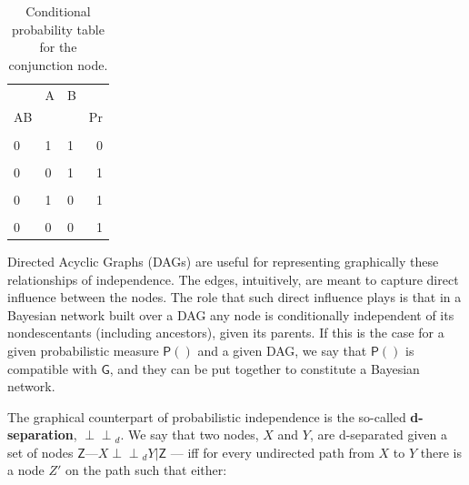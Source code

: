 \documentclass[
  10pt,
  dvipsnames,enabledeprecatedfontcommands]{scrartcl}
\newcommand{\indep}{\!\perp \!\!\! \perp\!}
\newcommand{\pr}[1]{\ensuremath{\mathsf{P}(#1)}}
\begin{document}
\begin{table}[h]
\begin{table}[H]
\centering
\begin{tabular}{lllr}
\toprule
\multicolumn{1}{c}{} & \multicolumn{1}{c}{A} & \multicolumn{1}{c}{B} & \multicolumn{1}{c}{} \\
AB &  &  & Pr\\
\midrule
\cellcolor{gray!6}{1} & \cellcolor{gray!6}{1} & \cellcolor{gray!6}{1} & \cellcolor{gray!6}{1}\\
0 & 1 & 1 & 0\\
\cellcolor{gray!6}{1} & \cellcolor{gray!6}{0} & \cellcolor{gray!6}{1} & \cellcolor{gray!6}{0}\\
0 & 0 & 1 & 1\\
\cellcolor{gray!6}{1} & \cellcolor{gray!6}{1} & \cellcolor{gray!6}{0} & \cellcolor{gray!6}{0}\\
0 & 1 & 0 & 1\\
\cellcolor{gray!6}{1} & \cellcolor{gray!6}{0} & \cellcolor{gray!6}{0} & \cellcolor{gray!6}{0}\\
0 & 0 & 0 & 1\\
\bottomrule
\end{tabular}
\end{table}
\normalsize
\caption{Conditional probability table for the conjunction node.}
\label{tab:CPTconjunction2}
\end{table}

\newpage 
\vspace{1mm}
\footnotesize

\normalsize

Directed Acyclic Graphs (DAGs) are useful for representing graphically
these relationships of independence. The edges, intuitively, are meant
to capture direct influence between the nodes. The role that such direct
influence plays is that in a Bayesian network built over a DAG any node
is conditionally independent of its nondescentants (including
ancestors), given its parents. If this is the case for a given
probabilistic measure \(\pr{}\) and a given DAG, we say that \(\pr{}\)
is compatible with \(\mathsf{G}\), and they can be put together to
constitute a Bayesian network.

The graphical counterpart of probabilistic independence is the so-called
\textbf{d-separation}, \(\indep_d\). We say that two nodes, \(X\) and
\(Y\), are d-separated given a set of nodes
\(\mathsf{Z}\)---\(X\indep_d Y \vert \mathsf{Z}\) --- iff for every
undirected path from \(X\) to \(Y\) there is a node \(Z'\) on the path
such that either:
\end{document}
